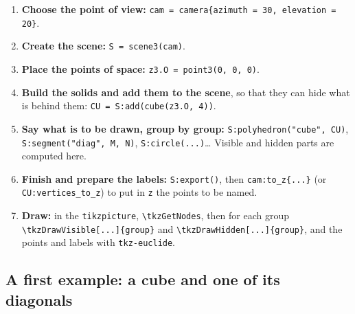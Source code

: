 \documentclass[11pt]{article}
\newcommand\code[1]{\texttt{#1}}
\newcommand\bs{\textbackslash}
\newenvironment{example}[1]
  {\def\exfile{#1.tex}\VerbatimOut{\exfile}}
  {\endVerbatimOut
   \VerbatimInput[fontsize=\small, frame=single]{\exfile}
   \begin{center}\end{center}}
\begin{document}
\begin{enumerate}
  \item \textbf{Choose the point of view:}
        \code{cam = camera\{azimuth = 30, elevation = 20\}}.
  \item \textbf{Create the scene:} \code{S = scene3(cam)}.
  \item \textbf{Place the points of space:} \code{z3.O = point3(0, 0, 0)}.
  \item \textbf{Build the solids and add them to the scene}, so that they
        can hide what is behind them: \code{CU = S:add(cube(z3.O, 4))}.
  \item \textbf{Say what is to be drawn, group by group:}
        \code{S:polyhedron("cube", CU)}, \code{S:segment("diag", M, N)},
        \code{S:circle(...)}\ldots{} Visible and hidden parts are computed
        here.
  \item \textbf{Finish and prepare the labels:} \code{S:export()}, then
        \code{cam:to\_z\{...\}} (or \code{CU:vertices\_to\_z}) to put in
        \code{z} the points to be named.
  \item \textbf{Draw:} in the \code{tikzpicture}, \code{\bs tkzGetNodes}, then
        for each group \code{\bs tkzDrawVisible[...]\{group\}} and
        \code{\bs tkzDrawHidden[...]\{group\}}, and the points and labels with
        \code{tkz-euclide}.
\end{enumerate}

\subsection{A first example: a cube and one of its diagonals}

\begin{example}{ex-cube}
\end{example}
\end{document}
